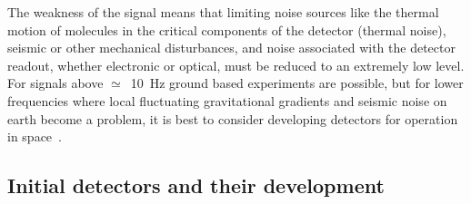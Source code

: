 \documentclass{article}
\begin{document}

The weakness of the signal means that limiting noise sources like the thermal
motion of molecules in the critical components of the detector (thermal noise),
seismic or other mechanical disturbances, and noise associated with the detector
readout, whether electronic or optical, must be reduced to an extremely low
level. For signals above $\simeq$~10~Hz ground based experiments are possible,
but for lower frequencies where local fluctuating gravitational gradients and
seismic noise on earth become a problem, it is best to consider developing
detectors for operation in space~\cite{LISA}.


\subsection{Initial detectors and their development}
\label{subsection:initdet}
\end{document}
